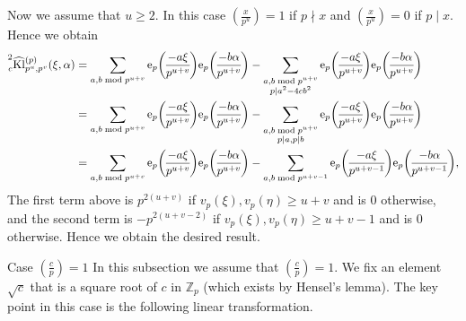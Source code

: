 \documentclass[10pt,oneside,reqno]{amsart}
\makeatletter
\newcommand\rme{\mathrm{e}}
\newcommand\ZZ{\mathbb{Z}}
\newcommand\Kl{\mathrm{Kl}}
\renewcommand\geq{\geqslant}
\newcommand\legendresymbol[2]{\genfrac{(}{)}{}{}{#1}{#2}}
\def\subsection{\@startsection{subsection}{2}%
  \z@{3pt\@plus0pt}{-.5em}%
  {\normalfont\bfseries}}
\theoremstyle{THEOREM}
\theoremstyle{DEFINITION}
\theoremstyle{EXERCISE}
\numberwithin{equation}{section}
\renewenvironment{proof}[1][\proofname]{\par
  \vspace{-6pt}
  \pushQED{\qed}
  \normalfont \topsep6\p@\@plus6\p@\relax
  \trivlist
  \item[\hskip\labelsep\rmfamily\bfseries
    #1\@addpunct{:}]\ignorespaces
}{
  \popQED\endtrivlist\@endpefalse
  \vspace{-6pt}
}
\makeatother
\begin{document}
\begin{proof}
Now we assume that $u\geq 2$. In this case $\legendresymbol{x}{p^u}=1$ if $p\nmid x$ and $\legendresymbol{x}{p^u}=0$ if $p\mid x$. Hence we obtain
\begin{align*}
\prescript{2}{c}{\widehat{\Kl}}_{p^u,p^v}^{(p)}(\xi,\alpha)&=\sum_{a,b\bmod p^{u+v}} \rme_p\legendresymbol{-a\xi}{p^{u+v}} \rme_p\legendresymbol{-b\alpha}{p^{u+v}}-\sum_{\substack{a,b\bmod p^{u+v}\\ p\mid a^2-4cb^2}} \rme_p\legendresymbol{-a\xi}{p^{u+v}} \rme_p\legendresymbol{-b\alpha}{p^{u+v}}\\
&=\sum_{a,b\bmod p^{u+v}} \rme_p\legendresymbol{-a\xi}{p^{u+v}} \rme_p\legendresymbol{-b\alpha}{p^{u+v}}-\sum_{\substack{a,b\bmod p^{u+v}\\ p\mid a,p\mid b}} \rme_p\legendresymbol{-a\xi}{p^{u+v}} \rme_p\legendresymbol{-b\alpha}{p^{u+v}}\\
&=\sum_{a,b\bmod p^{u+v}} \rme_p\legendresymbol{-a\xi}{p^{u+v}} \rme_p\legendresymbol{-b\alpha}{p^{u+v}}-\sum_{a,b\bmod p^{u+v-1}} \rme_p\legendresymbol{-a\xi}{p^{u+v-1}} \rme_p\legendresymbol{-b\alpha}{p^{u+v-1}},
\end{align*}
The first term above is $p^{2(u+v)}$ if $v_p(\xi),v_p(\eta)\geq u+v$ and is $0$ otherwise, and the second term is $-p^{2(u+v-2)}$ if $v_p(\xi),v_p(\eta)\geq u+v-1$ and is $0$ otherwise. Hence we obtain the desired result.
\end{proof}

\subsection{Case $\legendresymbol{c}{p}=1$}
In this subsection we assume that $\legendresymbol{c}{p}=1$. We fix an element $\sqrt{c}$ that is a square root of $c$ in $\ZZ_p$ (which exists by Hensel's lemma). The key point in this case is the following linear transformation.
\end{document}
